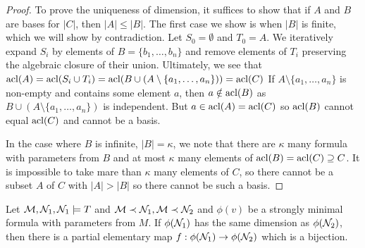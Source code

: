 \begin{proof}
To prove the uniqueness of dimension, it suffices to show that if \(A\) and \(B\) are bases for \(|C|\), then \(|A| \leq |B|\). 
The first case we show is when \(|B|\) is finite, which we will show by contradiction.  
Let \(S_0 = \emptyset\) and \(T_0 = A\). We iteratively expand \(S_i\) by elements of \(B = \{b_1, \ldots, b_n\}\) and remove elements of \(T_i\) preserving the algebraic closure of their union. 
Ultimately, we see that \(\text{acl}(A) = \text{acl}(S_i \cup T_i) = \text{acl}(B \cup (A \setminus \{a_1, \ldots, a_n\})) = \text{acl}(C)\)
If \(A \setminus \{a_1, \ldots, a_n\}\) is non-empty and contains some element \(a\), then \(a \notin \text{acl}(B)\) as \(B \cup (A \setminus \{a_1, \ldots, a_n\})\) is independent. 
But \(a \in \text{acl}(A) = \text{acl}(C)\) so \(\text{acl}(B)\) cannot equal \(\text{acl}(C)\) and cannot be a basis. 

In the case where \(B\) is infinite, \(|B| = \kappa\), we note that there are \(\kappa\) many formula with parameters from \(B\) and at most \(\kappa\) many elements of \(\text{acl}(B) = \text{acl}(C) \supseteq C\). 
It is impossible to take mare than \(\kappa\) many elements of \(C\), so there cannot be a subset \(A\) of \(C\) with \(|A| > |B|\) so there cannot be such a basis. 
\end{proof}

\begin{theorem}\label{partial_elementary_bijection}
Let \(\mathcal{M}, \mathcal{N}_1, \mathcal{N}_1 \models T\) and \(\mathcal{M} \prec \mathcal{N}_1, \mathcal{M} \prec \mathcal{N}_2\) and \(\phi(v)\) be a strongly minimal formula with parameters from \(M\).
If \(\phi(\mathcal{N}_1)\) has the same dimension as \(\phi(\mathcal{N}_2)\), then there is a partial elementary map \(f: \phi(\mathcal{N}_1) \to \phi(\mathcal{N}_2)\) which is a bijection. 
\end{theorem}

